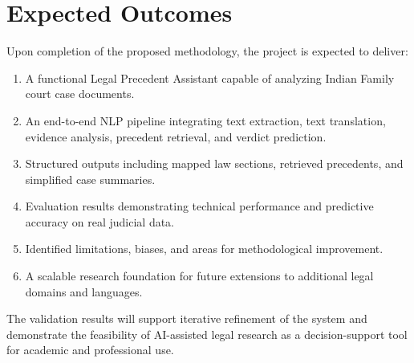 \newpage
\section{Expected Outcomes}
Upon completion of the proposed methodology, the project is expected to deliver:
\begin{enumerate}
	\item A functional Legal Precedent Assistant capable of analyzing Indian Family court case documents.
	\item An end-to-end NLP pipeline integrating text extraction, text translation, evidence analysis, precedent retrieval, and verdict prediction.
	\item Structured outputs including mapped law sections, retrieved precedents, and simplified case summaries.
	\item Evaluation results demonstrating technical performance and predictive accuracy on real judicial data.
	\item Identified limitations, biases, and areas for methodological improvement.
	\item A scalable research foundation for future extensions to additional legal domains and languages.
\end{enumerate}

The validation results will support iterative refinement of the system and demonstrate the feasibility of AI-assisted legal research as a decision-support tool for academic and professional use.


